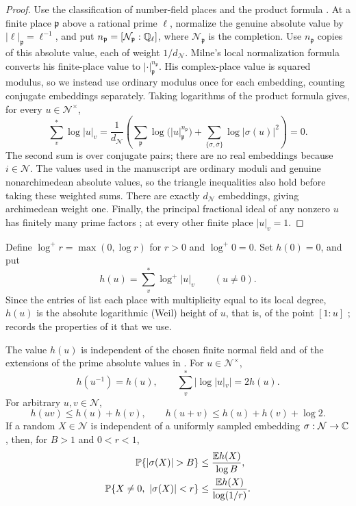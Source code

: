 \begin{proof}
Use the classification of number-field places and the product formula
\cite[Theorems~7.14--7.15]{ProductFormula}. At a finite place
\(\mathfrak p\) above a rational prime \(\ell\), normalize the genuine
absolute value by \(|\ell|_{\mathfrak p}=\ell^{-1}\), and put
\(n_{\mathfrak p}=[\mathcal N_{\mathfrak p}:\mathbb Q_\ell]\), where
\(\mathcal N_{\mathfrak p}\) is the completion. Use
\(n_{\mathfrak p}\) copies of this absolute value, each of weight
\(1/d_{\mathcal N}\). Milne's local normalization formula
\cite[Lemma~8.6]{ProductFormula} converts his finite-place value to
\(|\cdot|_{\mathfrak p}^{n_{\mathfrak p}}\). His complex-place value
is squared modulus, so we instead use ordinary modulus once for each
embedding, counting conjugate embeddings separately. Taking logarithms
of the product formula gives, for every \(u\in\mathcal N^\times\),
\[
 \sum_v^*\log|u|_v
 =\frac1{d_{\mathcal N}}\left(
   \sum_{\mathfrak p}\log\bigl(|u|_{\mathfrak p}^{n_{\mathfrak p}}\bigr)
   +\sum_{\{\sigma,\overline\sigma\}}\log|\sigma(u)|^2\right)=0.
\]
The second sum is over conjugate pairs; there are no real embeddings
because \(i\in\mathcal N\). The values used in the manuscript are
ordinary moduli and genuine nonarchimedean absolute values, so the
triangle inequalities also hold before taking these weighted sums.
There are exactly \(d_{\mathcal N}\)
embeddings, giving archimedean weight one. Finally, the principal
fractional ideal of any nonzero \(u\) has finitely many prime factors
\cite[Theorem~3.20]{ProductFormula}; at every other finite place
\(|u|_v=1\).
\end{proof}

Define $\log^+r=\max(0,\log r)$ for $r>0$ and $\log^+0=0$.
Set $h(0)=0$, and put
\[
 h(u)=\sum_v^*\log^+|u|_v\qquad(u\ne0).
\]
Since the entries of  list each place with multiplicity
equal to its local degree, $h(u)$ is the absolute logarithmic (Weil)
height of $u$, that is, of the point $[1:u]$
\cite[slide~3]{SilvermanHeights};  records the properties
of it that we use.

\begin{lemma}\label{ht:height}
The value $h(u)$ is independent of the chosen finite normal field and of
the extensions of the prime absolute values in .
For $u\in\mathcal N^\times$,
\begin{equation}\label{ht:height-inversion}
 h(u^{-1})=h(u),\qquad
 \sum_v^*|\log|u|_v|=2h(u).
\end{equation}
For arbitrary $u,v\in\mathcal N$,
\begin{equation}\label{ht:height-inequalities}
 h(uv)\le h(u)+h(v),\qquad
 h(u+v)\le h(u)+h(v)+\log2.
\end{equation}
If a random $X\in\mathcal N$ is independent of a uniformly sampled
embedding $\sigma:\mathcal N\to\mathbb C$, then, for $B>1$ and $0<r<1$,
\begin{align}
 \Prob\{|\sigma(X)|>B\}&\le\frac{\E h(X)}{\log B},
       \label{ht:large-tail}\\
 \Prob\{X\ne0,\ |\sigma(X)|<r\}
      &\le\frac{\E h(X)}{\log(1/r)}.
       \label{ht:small-tail}
\end{align}
\end{lemma}

